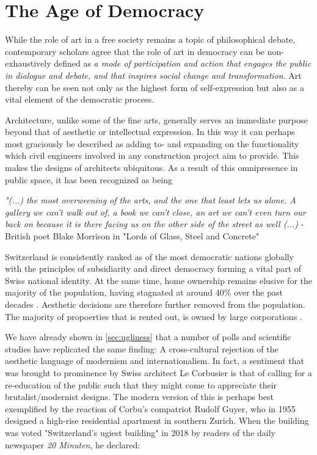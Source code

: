 \documentclass{article}
\begin{document}
\clearpage
\section{The Age of Democracy}
\label{sec:democracy}

\begin{multicols}{2}

While the role of art in a free society remains a topic of philosophical debate, contemporary scholars agree that the role of art in democracy can be non-exhaustively defined as \textit{a mode of participation and action that engages the public in dialogue and debate, and that inspires social change and transformation}. Art thereby can be seen not only as the highest form of self-expression but also as a vital element of the democratic process.

Architecture, unlike some of the fine arts, generally serves an immediate purpose beyond that of aesthetic or intellectual expression. In this way it can perhaps most graciously be described as adding to- and expanding on the functionality which civil engineers involved in any construction project aim to provide. This makes the designs of architects ubiquitous. As a result of this omnipresence in public space, it has been recognized as being

\textit{"(...) the most overweening of the arts, and the one that least lets us alone. A gallery we can't walk out of, a book we can't close, an art we can't even turn our back on because it is there facing us on the other side of the street as well (...)} - British poet Blake Morrison in "Lords of Glass, Steel and Concrete" \cite{morrison_lords_1982}

Switzerland is consistently ranked as of the most democratic nations globally \cite{noauthor_economist_2023} with the principles of subsidiarity and direct democracy forming a vital part of Swiss national identity. At the same time, home ownership remains elusive for the majority of the population, having stagnated at around 40\% over the past decades \cite{noauthor_home_2022}. Aesthetic decisions are therefore further removed from the population. The majority of propoerties that is rented out, is owned by large corporations \cite{noauthor_wem_nodate}.

We have already shown in \cref{sec:ugliness} that a number of polls and scientific studies have replicated the same finding: A cross-cultural rejection of the aesthetic language of modernism and internationalism. In fact, a sentiment that was brought to prominence by Swiss architect Le Corbusier is that of calling for a re-education of the public such that they might come to appreciate their brutalist/modernist designs. The modern version of this is perhaps best exemplified by the reaction of Corbu's compatriot Rudolf Guyer, who in 1955 designed a high-rise residential apartment in southern Zurich. When the building was voted "Switzerland's ugiest building" in 2018 by readers of the daily newspaper \textit{20 Minuten}, he declared:


\end{multicols}
\end{document}
